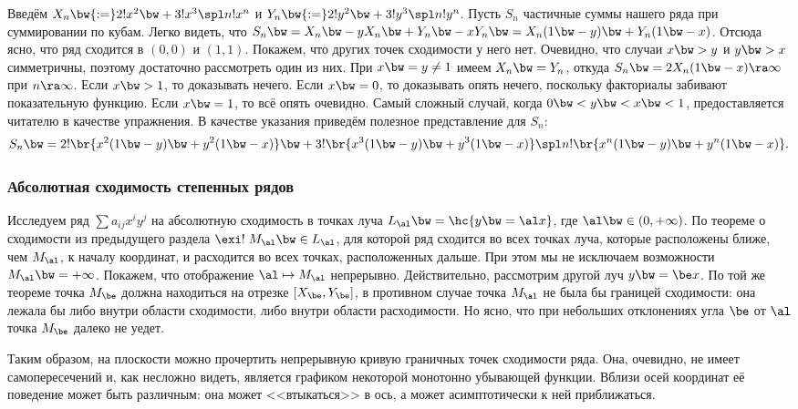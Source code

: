 \documentclass[a4paper]{article}
\newcommand{\elx}[1]{#1!x^{#1}}
\newcommand{\ely}[1]{#1!y^{#1}}
\begin{document}
Введём $X_n \bw{:=} \elx2 \bw+ \elx3\spl \elx n$ и $Y_n \bw{:=} \ely2 \bw+ \ely3\spl \ely n$. Пусть
$S_n$ частичные суммы нашего ряда при суммировании по кубам. Легко видеть, что $S_n \bw= X_n \bw-
yX_n \bw+ Y_n \bw- xY_n \bw= X_n(1\bw-y) \bw+ Y_n(1\bw-x)$. Отсюда ясно, что ряд сходится в $(0,0)$ и $(1,1)$.
Покажем, что других точек сходимости у него нет. Очевидно, что случаи $x\bw>y$ и $y\bw>x$
симметричны, поэтому достаточно рассмотреть один из них. При $x \bw= y \neq 1$ имеем $X_n \bw= Y_n$,
откуда $S_n \bw= 2X_n(1\bw-x) \ra \infty$ при $n \ra \infty$. Если $x \bw> 1$, то доказывать нечего. Если
$x\bw= 0$, то доказывать опять нечего, поскольку факториалы забивают показательную функцию. Если $x \bw=
1$, то всё опять очевидно. Самый сложный случай, когда $0 \bw< y \bw< x \bw< 1$, предоставляется читателю в
качестве упражнения. В качестве указания приведём полезное представление для $S_n$:
$$
  S_n \bw= 2!\br{x^2(1\bw-y) \bw+ y^2(1\bw-x)} \bw+ 3!\br{x^3(1\bw-y) \bw+ y^3(1\bw-x)}
  \spl n!\br{x^n(1\bw-y) \bw+ y^n(1\bw-x)}.
$$

\subsubsection{Абсолютная сходимость степенных рядов}

\vskip-10pt
\hangindent=-40mm
Исследуем ряд $\sum a_{ij}x^iy^j$ на абсолютную сходимость в точках луча
$L_\al \bw= \hc{y \bw= \al x}$, где $\al \bw\in (0,+\infty)$.
По теореме о сходимости из предыдущего раздела $\exi! \; M_\al \bw\in L_\al$, для которой ряд сходится
во всех точках луча, которые расположены ближе, чем $M_\al$, к началу координат, и расходится во
всех точках, расположенных дальше. При этом мы не исключаем возможности $M_\al \bw= +\infty$. Покажем,
что отображение $\al \mapsto M_\al$ непрерывно. Действительно, рассмотрим другой луч $y \bw= \be x$.
По той же теореме точка $M_\be$ должна находиться на отрезке $[X_\be, Y_\be]$, в противном случае
точка $M_\al$ не была бы границей сходимости: она лежала бы либо внутри области сходимости, либо
внутри области расходимости. Но ясно, что при небольших отклонениях угла $\be$ от $\al$ точка
$M_\be$ далеко не уедет.

Таким образом, на плоскости можно прочертить непрерывную кривую граничных точек сходимости ряда.
Она, очевидно, не имеет самопересечений и, как несложно видеть, является графиком некоторой
монотонно убывающей функции. Вблизи осей координат её поведение может быть различным:
она может <<втыкаться>> в ось, а может асимптотически к ней приближаться.
\end{document}
